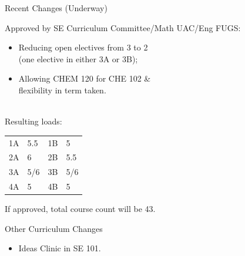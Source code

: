 \documentclass{beamer}
\newenvironment{changemargin}[1]{%
  \begin{list}{}{%
    \setlength{\topsep}{0pt}%
    \setlength{\leftmargin}{#1}%
    \setlength{\rightmargin}{1em}
    \setlength{\listparindent}{\parindent}%
    \setlength{\itemindent}{\parindent}%
    \setlength{\parsep}{\parskip}%
  }%
  \item[]}{\end{list}}
\begin{document}
\begin{frame}{Recent Changes (Underway)}
  \Large
  \begin{changemargin}{1em}
  Approved by SE Curriculum Committee/Math UAC/Eng FUGS:
    \begin{itemize}
    \item Reducing open electives from 3 to 2\\
      (one elective in either 3A or 3B);
    \item Allowing CHEM 120 for CHE 102 \& \\
      flexibility in term taken.
    \end{itemize}
    ~\\
    Resulting loads:
    \begin{center}
    \begin{tabular}{llll}
      1A & 5.5 & 1B & 5 \\
      2A & 6 & 2B & 5.5 \\
      3A & 5/6 & 3B & 5/6 \\
      4A & 5 & 4B & 5
    \end{tabular}
    \end{center}
    If approved, total course count will be 43.
  \end{changemargin}
\end{frame}

\begin{frame}{Other Curriculum Changes}
  \Large
  \begin{changemargin}{1em}
    \begin{itemize}
    \item Ideas Clinic in SE 101.
    \end{itemize}
  \end{changemargin}
\end{frame}
\end{document}
